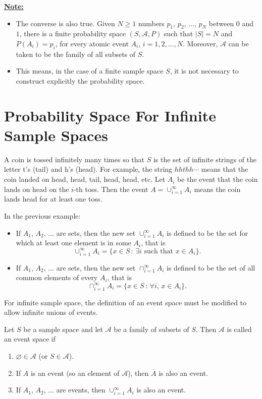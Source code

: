 \underline{\textbf{Note:}} 
\begin{itemize}
\item The converse is also true. Given $N \geq 1$ numbers $p_1$, $p_2$, $\ldots$, $p_N$ between $0$ and $1$, there is a finite probability space $(S , \mathcal{A} , P )$ such that $|S| = N$ and $P (A_i ) = p_i$, for every atomic event $A_i$, $i = 1 , 2, \ldots , N$. Moreover, $\mathcal{A}$ can be taken to be the family of all subsets of $S$.
\item This means, in the case of a finite sample space $S$, it is not necessary to construct explicitly the probability space.
\end{itemize}


\section{Probability Space For Infinite Sample Spaces}

\begin{example}
A coin is tossed infinitely many times so that $S$ is the set of infinite strings of the letter t's (tail) and h's (head). For example, the string $hhthh\cdots$ means that the coin landed on head, head, tail, head, head, etc. Let $A_i$ be the event that the coin lands on head on the $i$-th toss. Then the event $A = \cup_{i = 1}^\infty A_i$ means the coin lands head for at least one toss.
\end{example}

In the previous example:
	\begin{itemize}
	\item If $A_1$, $A_2$, $\ldots$ are sets, then the new set $\cup_{i = 1}^\infty A_i$ is defined to be the set for which at least one element is in some $A_i$, that is 
		\[
			\cup_{i = 1}^\infty A_i = \{ x \in S \, : \, \exists i \text{ such that } x \in A_i \} .
		\]
	\item If $A_1$, $A_2$, $\ldots$ are sets, then the new set $\cap_{i = 1}^\infty A_i$ is defined to be the set of all common elements of every $A_i$, that is
		\[
			\cap_{i = 1}^\infty A_i = \{ x \in S \, : \, \forall i , \, x \in A_i \} .
		\]
	\end{itemize}

For infinite sample space, the definition of an event space must be modified to allow infinite unions of events.

\begin{definition}
Let $S$ be a sample space and let $\mathcal{A}$ be a family of subsets of $S$. Then $\mathcal{A}$ is called an event space if
	\begin{enumerate}[label=\alph*)]
	\item $\varnothing \in \mathcal{A}$ (or $S \in \mathcal{A}$).
	\item If $A$ is an event (so an element of $\mathcal{A}$), then $\overline{A}$ is also an event.
	\item If $A_1$, $A_2$, $\ldots$ are events, then $\cup_{i = 1}^\infty A_i$ is also an event.
	\end{enumerate}
\end{definition}

